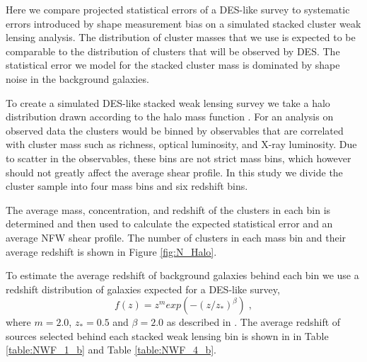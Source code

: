Here we compare projected statistical errors of a DES-like survey 
to systematic errors introduced by shape measurement bias on 
a simulated stacked cluster weak lensing
analysis. The distribution of cluster masses that we use is 
expected to be comparable to the distribution of clusters that will
be observed by DES. The statistical error we model for the stacked
cluster mass is dominated by shape noise in the background galaxies.

To create a simulated DES-like stacked weak lensing survey we
take a halo distribution drawn according to the halo mass function . For an analysis on observed data the clusters would
be binned by observables that are correlated with cluster mass such as richness,
optical luminosity, and X-ray luminosity. Due to scatter in the observables, these bins are not strict mass bins, which however should not greatly affect the average shear profile. In this
study we divide the cluster sample into four mass bins and six
redshift bins. 


The average mass, concentration, and redshift of the
clusters in each bin is determined and then used to calculate the
expected statistical error and an average NFW shear profile.  The
number of clusters in each mass bin and their average redshift is
shown in Figure \ref{fig:N_Halo}.

To estimate the average redshift of background galaxies behind
each bin 
we use a redshift distribution of galaxies expected for a DES-like survey,
\begin{equation}
f(z) = z^m exp(-( z/z_* )^{\beta}) \; ,
\end{equation}
where $m=2.0 $, $z_*=0.5$ and $\beta = 2.0 $ as described in
\citep{obscos}. The average redshift of sources selected behind each
stacked weak lensing bin is shown in in Table
\ref{table:NWF_1_b} and Table \ref{table:NWF_4_b}.

